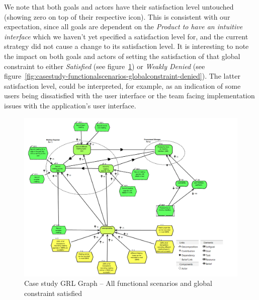\documentclass[dissertation,final]{softeng}
\begin{document}
We note that both goals and actors have their satisfaction level untouched (showing zero on top of their respective icon). This is consistent with our expectation, since all goals are dependent on the \emph{Product to have an intuitive interface} which we haven't yet specified a satisfaction level for, and the current strategy did not cause a change to its satisfaction level. It is interesting to note the impact on both goals and actors of setting the satisfaction of that global constraint to either \emph{Satisfied} (see figure~\ref{fig:casestudy-functionalscenarios-globalconstraint}) or \emph{Weakly Denied} (see figure~\ref{fig:casestudy-functionalscenarios-globalconstraint-denied}). The latter satisfaction level, could be interpreted, for example, as an indication of some users being dissatisfied with the user interface or the team facing implementation issues with the application's user interface.

\begin{figure}
\includegraphics[width=\columnwidth]{casestudy-functionalscenarios-globalconstraint}
\centering
\caption{Case study GRL Graph -- All functional scenarios and global constraint satisfied}
\label{fig:casestudy-functionalscenarios-globalconstraint}
\end{figure} 
\end{document}
